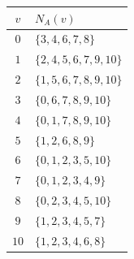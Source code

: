 \begin{tabular}{cl}
\toprule
\(v\)&\(N_A(v)\)\\\midrule
$0$ & $\{3,4,6,7,8\}$\\
$1$ & $\{2,4,5,6,7,9,10\}$\\
$2$ & $\{1,5,6,7,8,9,10\}$\\
$3$ & $\{0,6,7,8,9,10\}$\\
$4$ & $\{0,1,7,8,9,10\}$\\
$5$ & $\{1,2,6,8,9\}$\\
$6$ & $\{0,1,2,3,5,10\}$\\
$7$ & $\{0,1,2,3,4,9\}$\\
$8$ & $\{0,2,3,4,5,10\}$\\
$9$ & $\{1,2,3,4,5,7\}$\\
$10$ & $\{1,2,3,4,6,8\}$\\
\bottomrule
\end{tabular}
